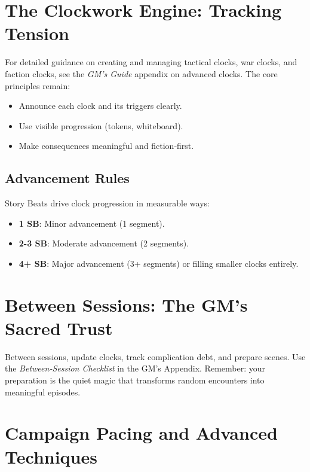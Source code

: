 \section{The Clockwork Engine: Tracking Tension}
\label{sec:clockwork-engine}

For detailed guidance on creating and managing tactical clocks, war clocks, and faction clocks, see the \textit{GM’s Guide} appendix on advanced clocks. The core principles remain:
\begin{itemize}
  \item Announce each clock and its triggers clearly.
  \item Use visible progression (tokens, whiteboard).
  \item Make consequences meaningful and fiction‑first.
\end{itemize}

\subsection{Advancement Rules}
Story Beats drive clock progression in measurable ways:
\begin{itemize}
  \item \textbf{1 SB}: Minor advancement (1 segment).
  \item \textbf{2-3 SB}: Moderate advancement (2 segments).
  \item \textbf{4+ SB}: Major advancement (3+ segments) or filling smaller clocks entirely.
\end{itemize}

\section{Between Sessions: The GM’s Sacred Trust}
\label{sec:between-sessions}

Between sessions, update clocks, track complication debt, and prepare scenes. Use the \textit{Between‑Session Checklist} in the GM’s Appendix. Remember: your preparation is the quiet magic that transforms random encounters into meaningful episodes.

\section{Campaign Pacing and Advanced Techniques}
\label{sec:campaign-pacing}

